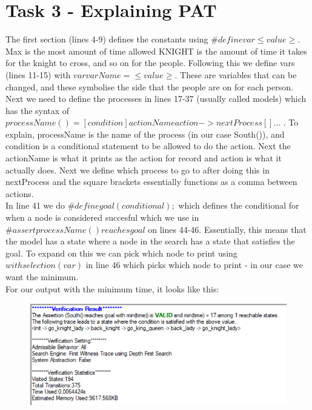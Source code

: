 \documentclass{article}
\newcommand\tab[1][1cm]{\hspace*{#1}}
\begin{document}
\section*{Task 3 - Explaining PAT}
The first section (lines 4-9) defines the constants using 
$\#define var \leq value \geq$. Max is the most amount of time allowed
KNIGHT is the amount of time it takes for the knight to cross, and so on for
the people. Following this we define vars (lines 11-15) with 
$var varName = \leq value \geq$. These are variables
that can be changed, and these symbolise the side that the
people are on for each person. \\
\tab Next we need to define the processes in lines 17-37 
(usually called models) which has the syntax of 
$processName() = [condition]actionName{action} -> nextProcess [] ...$
. To explain, processName is the name of the process (in our case
South()), and condition is a conditional statement to be allowed
to do the action. Next the actionName is what it prints as 
the action for record and action is what it actually does. Next
we define which process to go to after doing this in nextProcess
and the square brackets essentially functions as a comma between
actions. \\
\tab In line 41 we do $\#define goal(conditional);$ which 
defines the conditional
for when a node is considered succesful which we use in 
$\#assert processName() reaches goal$ on lines 44-46. Essentially, 
this means that the model has a state where a node in the 
search has a state that satisfies the goal. To expand
on this we can pick which node to print using 
$with selection(var)$ in line 46 which picks which node to 
print - in our case we want the minimum.\\
For our output with the minimum time, it looks like this:
\begin{figure}[ht]
    \centering
    \includegraphics{imgs/verification.png}
\end{figure}
\end{document}
